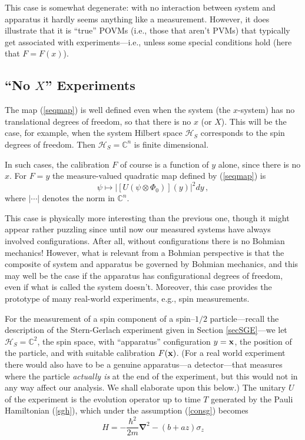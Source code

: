 \documentclass[12pt]{article}
\newcommand{\BM}{Bohmian mechanics}
\renewcommand{\H}{\mbox{$\mathcal{H}$}}
\newcommand{\CC}{\mathbb{C}}
\begin{document}
This case is somewhat degenerate: with no interaction between system
and apparatus it hardly seems anything like a measurement.  However,
it does illustrate that it is ``true'' POVMs (i.e., those that aren't
PVMs) that typically get associated with experiments---i.e., unless
some special conditions hold (here that $F=F(x)$).


\subsection{``No $X$'' Experiments}\label{noXexp}

The map (\ref{seqmap}) is well defined even when the system (the
$x$-system) has no translational degrees of freedom, so that there is
no $x$ (or $X$). This will be the case, for example, when the system
Hilbert space $\H_S$ corresponds to the spin degrees of freedom. Then
$\H_S=\CC^n$ is finite dimensional.

In such cases, the calibration $F$ of course is a function of $y$
alone, since there is no $x$.  For $F=y$ the measure-valued quadratic
map defined by (\ref{seqmap}) is
\begin{equation}
   \psi \mapsto |
[U(\psi\otimes\Phi_{0})](y)|^{2} dy\,,
\label{eq:nox}
\end{equation}
where $|\cdots |$ denotes the norm in $\CC^n$.


This case is physically more interesting than the previous one, though
it might appear rather puzzling since until now our measured systems
have always involved configurations.  After all, without
configurations there is no Bohmian mechanics!  However, what is
relevant {}from a Bohmian perspective is that the composite of system
and apparatus be governed by \BM{}, and this may well be the case if
the apparatus has configurational degrees of freedom, even if what is
called the system doesn't. Moreover, this case provides the prototype
of many real-world experiments, e.g., spin measurements.

For the measurement of a spin component of a spin--$1/2$
particle---recall the description of the Stern-Gerlach experiment
given in Section \ref{secSGE}---we let $\H_{S}= \CC^2$, the spin
space, with ``apparatus'' configuration $y= {\bf x}$, the position of
the particle, and with suitable calibration $F({\bf x}) $.  (For a
real world experiment there would also have to be a genuine
apparatus---a detector---that measures where the particle
\emph{actually is} at the end of the experiment, but this would not in
any way affect our analysis.  We shall elaborate upon this below.)
The unitary $U$ of the experiment is the evolution operator up to time
$T$ generated by the Pauli Hamiltonian (\ref{sgh}), which under the
assumption (\ref{consg}) becomes
\begin{equation}
H = -\frac{\hbar^{2}}{2m} \boldsymbol{\nabla}^{2}  - ( b+ az) \sigma_{z}
\label{eq:pahamagain}
\end{equation}
\end{document}
